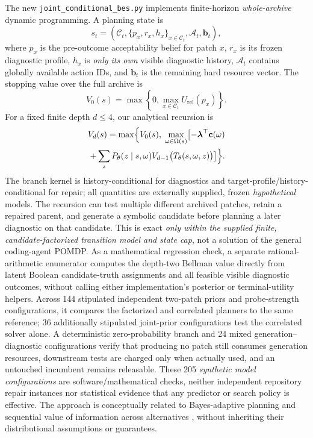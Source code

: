 \documentclass[pdflatex,sn-basic]{sn-jnl}
\begin{document}
The new
\texttt{joint\_conditional\_bes.py} implements finite-horizon
\emph{whole-archive} dynamic programming. A planning state is
\begin{equation}
 s_t=\left(\mathcal C_t,
 \{p_x,r_x,h_x\}_{x\in\mathcal C_t},
 \mathcal A_t,\mathbf b_t\right),
 \label{eq:joint-archive-state}
\end{equation}
where $p_x$ is the pre-outcome acceptability belief for patch
$x$, $r_x$ is its frozen diagnostic profile, $h_x$ is
\emph{only its own} visible diagnostic history,
$\mathcal A_t$ contains globally available action IDs, and
$\mathbf b_t$ is the remaining hard resource vector.
The stopping value over the full archive is
\begin{equation}
 V_0(s)=\max\left\{0,\max_{x\in\mathcal C_t}
 U_{\mathrm{rel}}(p_x)\right\}.
 \label{eq:archive-stop}
\end{equation}
For a fixed finite depth $d\le4$, our analytical recursion is
\begin{equation}
 \begin{split}
 V_d(s)=\max\Bigl\{V_0(s),\;
 \max_{\omega\in\Omega(s)}
 \bigl[-\boldsymbol\lambda^\top\mathbf c(\omega)\\
 +\sum_{z}P_{\theta}(z\mid s,\omega)
 V_{d-1}\bigl(T_{\theta}(s,\omega,z)\bigr)\bigr]\Bigr\}.
 \end{split}
 \label{eq:joint-archive-bellman}
\end{equation}
The branch kernel is history-conditional for diagnostics and
target-profile/history-conditional for repair; all quantities
are externally supplied, frozen \emph{hypothetical} models.
The recursion can test multiple different archived patches,
retain a repaired parent, and generate a symbolic candidate
before planning a later diagnostic on that candidate.
This is exact \emph{only within the supplied finite,
candidate-factorized transition model and state cap}, not
a solution of the general coding-agent POMDP. As a
mathematical regression check, a separate rational-arithmetic
enumerator computes the depth-two Bellman value directly
from latent Boolean candidate-truth assignments and all
feasible visible diagnostic outcomes, without calling
either implementation's posterior or terminal-utility
helpers. Across 144 stipulated independent two-patch
priors and probe-strength configurations, it compares
the factorized and correlated planners to the same
reference; 36 additionally stipulated joint-prior
configurations test the correlated solver alone.
A deterministic zero-probability branch and 24 mixed
generation--diagnostic configurations verify that
producing no patch still consumes generation resources,
downstream tests are charged only when actually used,
and an untouched incumbent remains releasable.
These 205 \emph{synthetic model configurations}
are software/mathematical checks, neither independent
repository repair instances nor statistical evidence
that any predictor or search policy is effective.
The approach is conceptually related to Bayes-adaptive planning
\cite{ross2011bayesadaptive} and sequential value of
information across alternatives
\cite{mes2011hierarchicalkg}, without inheriting their
distributional assumptions or guarantees.
\end{document}
